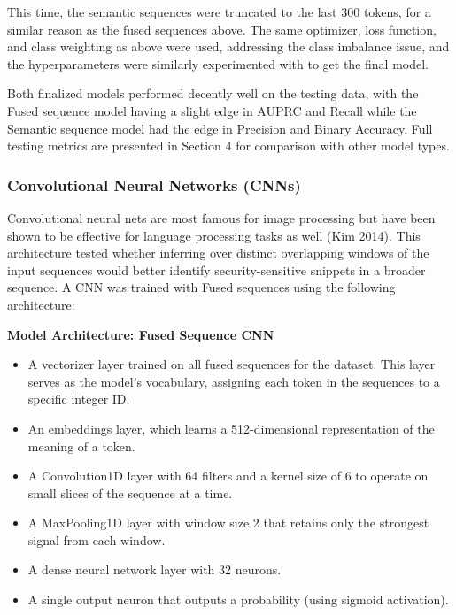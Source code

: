 \documentclass[11pt]{article}
\newenvironment{architecturebox}
  {\par\medskip\noindent\begin{minipage}{\linewidth}\begin{framed}}
  {\end{framed}\end{minipage}\par\medskip}
\begin{document}
This time, the semantic sequences were truncated to the last 300 tokens,
for a similar reason as the fused sequences above. The same
optimizer, loss function, and class weighting as above were used,
addressing the class imbalance issue, and the hyperparameters were
similarly experimented with to get the final model.

Both finalized models performed decently well on the testing data, with
the Fused sequence model having a slight edge in AUPRC and Recall while
the Semantic sequence model had the edge in Precision and Binary
Accuracy. Full testing metrics are presented in Section 4 for
comparison with other model types.

\subsubsection{Convolutional Neural Networks (CNNs)}\label{convolutional-neural-networks-cnns}

Convolutional neural nets are most famous for image processing but have
been shown to be effective for language processing tasks as well (Kim
2014). This architecture tested whether inferring over distinct overlapping
windows of the input sequences would better identify security-sensitive
snippets in a broader sequence. A CNN was trained with Fused sequences
using the following architecture:

\begin{architecturebox}
\noindent\textbf{Model Architecture: Fused Sequence CNN}

\begin{itemize}
\item
  A vectorizer layer trained on all fused sequences for the dataset.
  This layer serves as the model's vocabulary, assigning each token in
  the sequences to a specific integer ID.
\item
  An embeddings layer, which learns a 512-dimensional representation of
  the meaning of a token.
\item
  A Convolution1D layer with 64 filters and a kernel size of 6 to
  operate on small slices of the sequence at a time.
\item
  A MaxPooling1D layer with window size 2 that retains only the
  strongest signal from each window.
\item
  A dense neural network layer with 32 neurons.
\item
  A single output neuron that outputs a probability (using sigmoid
  activation).
\end{itemize}
\end{architecturebox}
\end{document}
